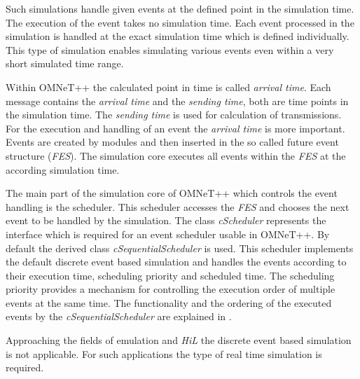 Such simulations handle given events at the defined point in the simulation time.
The execution of the event takes no simulation time.
Each event processed in the simulation is handled at the exact simulation time which is defined individually.
This type of simulation enables simulating various events even within a very short simulated time range.



Within OMNeT++ the calculated point in time is called \emph{arrival time}.
Each message contains the \emph{arrival time} and the \emph{sending time}, both are time points in the simulation time.
The \emph{sending time} is used for calculation of transmissions.
For the execution and handling of an event the \emph{arrival time} is more important.
Events are created by modules and then inserted in the so called future event structure (\emph{FES}).
The simulation core executes all events within the \emph{FES} at the according simulation time.

The main part of the simulation core of OMNeT++ which controls the event handling is the scheduler.
This scheduler accesses the \emph{FES} and chooses the next event to be handled by the simulation.
The class \emph{cScheduler} represents the interface which is required for an event scheduler usable in OMNeT++.
By default the derived class \emph{cSequentialScheduler} is used.
This scheduler implements the default discrete event based simulation and handles the events according to their execution time, scheduling priority and scheduled time.
The scheduling priority provides a mechanism for controlling the execution order of multiple events at the same time.
The functionality and the ordering of the executed events by the \emph{cSequentialScheduler} are explained in \cite[section 4.1]{omnet_manual}.

Approaching the fields of emulation and \emph{HiL} the discrete event based simulation is not applicable.
For such applications the type of real time simulation is required.

